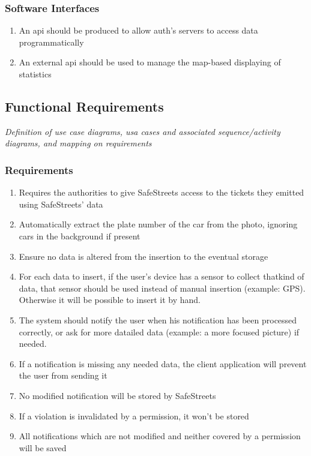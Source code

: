 \documentclass{article}
\newcommand{\enum}[1]{\texttt{#1.\arabic*}}
\begin{document}
		\subsubsection{Software Interfaces}
			\begin{enumerate}[label=\enum{SW}]
				\item \label{SW:Internal api} An api should be produced to allow auth's servers to access data programmatically
				\item \label{SW:map api} An external api should be used to manage the map-based displaying of statistics
			\end{enumerate}
			
	\subsection{Functional Requirements} \textit{Definition of use case diagrams, usa cases and associated sequence/activity diagrams, and mapping on requirements}
			
		\subsubsection{Requirements}
		
			\begin{enumerate}[label=\enum{R}]
				\item \label{R:storeTickets}Requires the authorities to give SafeStreets access to the tickets they emitted using SafeStreets' data
				\item \label{R:autoPlate}Automatically extract the plate number of the car from the photo, ignoring cars in the background if present
				\item \label{R:unalteredData}Ensure no data is altered from the insertion to the eventual storage
				\item \label{R:dataGather}For each data to insert, if the  user's device has a sensor to collect thatkind of data, that sensor should be used instead of manual insertion (example: GPS). Otherwise it will be possible to insert it by hand.
				\item \label{R:notifyUser}The system should notify the user when his notification has been processed correctly, or ask for more datailed data (example: a more focused picture) if needed.
				\item \label{R:fullData}If a notification is missing any needed data, the client application will prevent the user from sending it
				\item \label{R:modifiedNotStored}No modified notification will be stored by SafeStreets
				\item \label{R:validPermissionNotStored}If a violation is invalidated by a permission, it won't be stored
				\item \label{R:legitNotificationsAlwaysStored}All notifications which are not modified and neither covered by a permission will be saved
			\end{enumerate}
				
\end{document}
